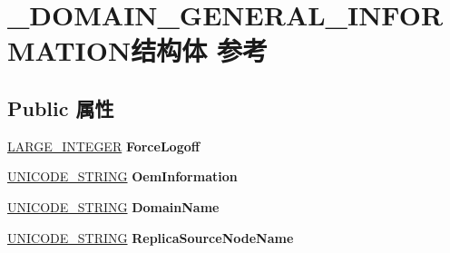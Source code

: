 \hypertarget{struct___d_o_m_a_i_n___g_e_n_e_r_a_l___i_n_f_o_r_m_a_t_i_o_n}{}\section{\+\_\+\+D\+O\+M\+A\+I\+N\+\_\+\+G\+E\+N\+E\+R\+A\+L\+\_\+\+I\+N\+F\+O\+R\+M\+A\+T\+I\+O\+N结构体 参考}
\label{struct___d_o_m_a_i_n___g_e_n_e_r_a_l___i_n_f_o_r_m_a_t_i_o_n}
\subsection*{Public 属性}
\begin{DoxyCompactItemize}
\item 
\mbox{\label{struct___d_o_m_a_i_n___g_e_n_e_r_a_l___i_n_f_o_r_m_a_t_i_o_n_aadda861c9a41622263e33855ed303af9}} 
\hyperlink{union___l_a_r_g_e___i_n_t_e_g_e_r}{L\+A\+R\+G\+E\+\_\+\+I\+N\+T\+E\+G\+ER} {\bfseries Force\+Logoff}
\item 
\mbox{\label{struct___d_o_m_a_i_n___g_e_n_e_r_a_l___i_n_f_o_r_m_a_t_i_o_n_aca30873944561467dbe0890e761cc6c4}} 
\hyperlink{struct___u_n_i_c_o_d_e___s_t_r_i_n_g}{U\+N\+I\+C\+O\+D\+E\+\_\+\+S\+T\+R\+I\+NG} {\bfseries Oem\+Information}
\item 
\mbox{\label{struct___d_o_m_a_i_n___g_e_n_e_r_a_l___i_n_f_o_r_m_a_t_i_o_n_aee4090dbf0ac87dee59464d004e7b71e}} 
\hyperlink{struct___u_n_i_c_o_d_e___s_t_r_i_n_g}{U\+N\+I\+C\+O\+D\+E\+\_\+\+S\+T\+R\+I\+NG} {\bfseries Domain\+Name}
\item 
\mbox{\label{struct___d_o_m_a_i_n___g_e_n_e_r_a_l___i_n_f_o_r_m_a_t_i_o_n_a25475a49b4770322b893607d25328fa5}} 
\hyperlink{struct___u_n_i_c_o_d_e___s_t_r_i_n_g}{U\+N\+I\+C\+O\+D\+E\+\_\+\+S\+T\+R\+I\+NG} {\bfseries Replica\+Source\+Node\+Name}
\item 
\mbox{\label{struct___d_o_m_a_i_n___g_e_n_e_r_a_l___i_n_f_o_r_m_a_t_i_o_n_a7d78d7a182263e000c0e6055b70bfd98}} 

\end{DoxyCompactItemize}
